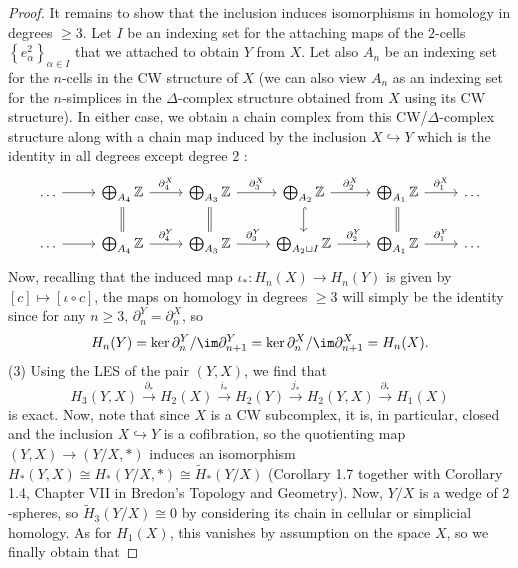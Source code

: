 \begin{proof}
        It remains to show that the inclusion induces
        isomorphisms in homology in degrees $\ge 3$.
        Let $I$ be an indexing set
        for the attaching maps of the
         $2$-cells 
         $\left\{ e_{\alpha}^2 \right\}_{\alpha \in I}$
         that we attached to obtain $Y$ from $X$.
         Let also $A_n$ be an indexing set for
         the $n$-cells in the CW structure of $X$ (we can also view
         $A_n$ as an indexing set for the
         $n$-simplices in the $\Delta$-complex structure obtained
         from $X$ using its CW structure).
         In either case, we obtain a chain complex
         from this CW/$\Delta$-complex structure 
         along with a chain map induced
         by the inclusion $X \hookrightarrow Y$ which
         is the identity in all degrees except degree
         $2$ :
         \begin{equation*}
    \begin{tikzcd}
        \ldots \ar[r] &\bigoplus_{A_4} \mathbb{Z} \ar[r,
        "\partial_4^{X}"] \ar[d, equal] 
        & \bigoplus_{A_3} \mathbb{Z} \ar[r, "\partial_3^{X}"]
        \ar[d, equal] &
        \bigoplus_{A_2} \mathbb{Z} \ar[d, hookrightarrow] \ar[r,
        "\partial_2^{X}"] &
        \bigoplus_{A_1} \mathbb{Z} \ar[d, equal] 
        \ar[r, "\partial_1^{X}"] & \ldots \\
        \ldots \ar[r] &\bigoplus_{A_4}\mathbb{Z} \ar[r,
        "\partial_4^{Y}"]
        & \bigoplus_{A_3} \mathbb{Z} \ar[r, "\partial_3^{Y}"] &
        \bigoplus_{A_2 \sqcup I} \mathbb{Z} \ar[r, "\partial_2^{Y}"]
        & 
        \bigoplus_{A_1} \mathbb{Z} \ar[r, "\partial_1^{Y}"] & \ldots
    \end{tikzcd}
    \end{equation*}
    Now, recalling that the induced
    map  $\iota_{*} \colon
    H_n \left( X \right) \to 
    H_n (Y)$ is given by
    $\left[ c \right] \mapsto 
    \left[ \iota \circ c \right] $, 
    the maps on homology in degrees $ \ge 3$ will
    simply be the identity since
    for any $n \ge 3$, $\partial_n^{Y} = 
    \partial_n^{X}$, so
    \[
    H_n (Y) = \ker \partial_n^{Y} / \im \partial_{n+1}^{Y}
    = \ker \partial_n^{X} / \im \partial_{n+1}^{X}
    = H_n (X).
    \] 
    (3) Using the LES of the pair $\left( Y,X \right) $, we
    find that
    \[
    H_3 \left( Y,X \right) \stackrel{\partial_*}{\to} 
    H_2 \left( X \right) \stackrel{i_*}{\to} 
    H_2 (Y) \stackrel{j_*}{\to}  H_2 (Y,X) \stackrel{\partial_*}{\to} 
    H_1 \left( X \right) 
    \] 
    is exact. 
    Now, note that since $X$ is a CW subcomplex, it
    is, in particular, closed and
    the inclusion  $X \hookrightarrow Y$ is a cofibration,
    so the quotienting map
    $\left( Y,X \right) \to \left( Y / X, * \right) $ 
    induces an isomorphism
    $H_* \left( Y,X \right) \cong
    H_* \left( Y / X, * \right) \cong
    \tilde{H}_* (Y / X)$
    (Corollary 1.7 together with
    Corollary 1.4, Chapter VII in Bredon's Topology and Geometry).
    Now, $Y / X$ is a wedge of
    $2$-spheres, so 
    $\tilde{H}_3 (Y / X) \cong 0$ by considering
    its chain in cellular or simplicial homology.
    As for $H_1 (X)$, this vanishes by assumption on the
    space $X$, so we finally obtain that
    

\end{proof}
